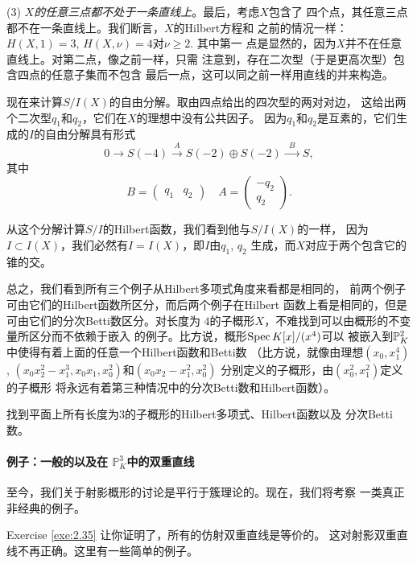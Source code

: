 (3) \textit{$X$的任意三点都不处于一条直线上}。最后，考虑$X$包含了
四个点，其任意三点都不在一条直线上。我们断言，$X$的Hilbert方程和
之前的情况一样：$H(X,1)=3$, $H(X,\nu)=4$对$\nu\geq 2$. 其中第一
点是显然的，因为$X$并不在任意直线上。对第二点，像之前一样，只需
注意到，存在二次型（于是更高次型）包含四点的任意子集而不包含
最后一点，这可以同之前一样用直线的并来构造。

现在来计算$S/I(X)$的自由分解。取由四点给出的四次型的两对对边，
这给出两个二次型$q_1$和$q_2$，它们在$X$的理想中没有公共因子。
因为$q_1$和$q_2$是互素的，它们生成的$I$的自由分解具有形式
\[
	0\longrightarrow S(-4)\xrightarrow{A}
	S(-2)\oplus S(-2)\xrightarrow{\;\;B\;\;} S,
\]
其中
\[
	B=\begin{pmatrix}
		q_1&q_2
	\end{pmatrix}
	\quad
	A=\begin{pmatrix}
		-q_2\\
		q_2
	\end{pmatrix}.
\]

从这个分解计算$S/I$的Hilbert函数，我们看到他与$S/I(X)$的一样，
因为$I\subset I(X)$，我们必然有$I=I(X)$，即$I$由$q_1$, $q_2$
生成，而$X$对应于两个包含它的锥的交。

总之，我们看到所有三个例子从Hilbert多项式角度来看都是相同的，
前两个例子可由它们的Hilbert函数所区分，而后两个例子在Hilbert
函数上看是相同的，但是可由它们的分次Betti数区分。对长度为
$4$的子概形$X$，不难找到可以由概形的不变量所区分而不依赖于嵌入
的例子。比方说，概形$\spec K[x]/(x^4)$可以
被嵌入到$\P_K^2$中使得有着上面的任意一个Hilbert函数和Betti数
（比方说，就像由理想$(x_0,x_1^4)$, 
$(x_0x_2^2-x_1^3,x_0x_1,x_0^2)$和$(x_0x_2-x_1^2,x_0^2)$
分别定义的子概形，由$(x_0^2,x_1^2)$定义的子概形
将永远有着第三种情况中的分次Betti数和Hilbert函数）。

\begin{exe}\label{exe:3.63}
找到平面上所有长度为$3$的子概形的Hilbert多项式、Hilbert函数以及
分次Betti数。
\end{exe}

\paragraph*{例子：一般的以及在
\texorpdfstring{$\mathbb P_K^3$}{PK3}中的双重直线}
至今，我们关于射影概形的讨论是平行于簇理论的。现在，我们将考察
一类真正非经典的例子。

Exercise \ref{exe:2.35} 让你证明了，所有的仿射双重直线是等价的。
这对射影双重直线不再正确。这里有一些简单的例子。

